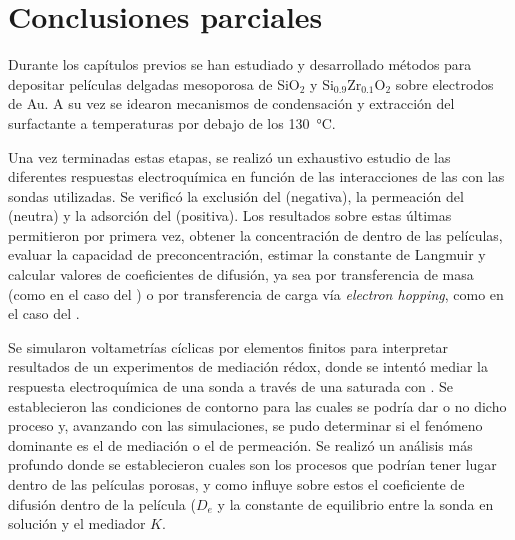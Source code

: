 \section{Conclusiones parciales}
	
	Durante los capítulos previos se han estudiado y desarrollado métodos para depositar películas delgadas mesoporosa de SiO$_2$ y Si$_{0.9}$Zr$_{0.1}$O$_2$  sobre electrodos de Au. A su vez se idearon mecanismos de condensación y extracción del surfactante a temperaturas por debajo de los \SI{130}{\celsius}. 

	Una vez terminadas estas etapas, se realizó un exhaustivo estudio de las diferentes respuestas electroquímica en función de las interacciones de las \pdm\space con las sondas utilizadas. Se verificó la exclusión del \ferroferri\space (negativa), la permeación del \fc\space (neutra) y la adsorción del \aminorutenio\space (positiva). Los resultados sobre estas últimas permitieron por primera vez, obtener la concentración de \ru\space dentro de las películas, evaluar la capacidad de preconcentración, estimar la constante de Langmuir y calcular valores de coeficientes de difusión, ya sea por transferencia de masa (como en el caso del \fc) o por transferencia de carga vía \textit{electron hopping}, como en el caso del \ru.

	Se simularon voltametrías cíclicas por elementos finitos para interpretar resultados de un experimentos de mediación rédox, donde se intentó mediar la respuesta electroquímica de una sonda a través de una \pdm\space saturada con \ru. Se establecieron las condiciones de contorno para las cuales se podría dar o no dicho proceso y, avanzando con las simulaciones, se pudo determinar si el fenómeno dominante es el de mediación o el de permeación. Se realizó un análisis más profundo donde se establecieron cuales son los procesos que podrían tener lugar dentro de las películas porosas, y como influye sobre estos el coeficiente de difusión dentro de la película ($D_e$ y la constante de equilibrio entre la sonda en solución y el mediador $K$.


